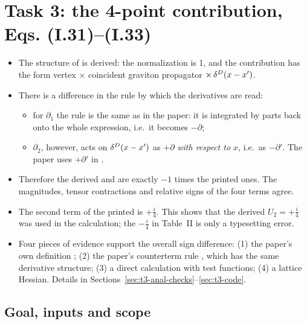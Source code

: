 \section{Task 3: the 4-point contribution, Eqs. (I.31)--(I.33)}
\label{sec:t3}

\begin{discbox}
\begin{itemize}[leftmargin=1.2em,nosep]
\item The structure of  is derived: the normalization is 1, and the
contribution has the form vertex \(\times\) coincident graviton propagator
\(\times\,\delta^D(x-x')\).
\item There is a difference in the rule by which the derivatives are read:
\begin{itemize}[nosep]
\item for \(\partial_1\) the rule is the same as in the paper: it is integrated by parts
back onto the whole expression, i.e.\ it becomes \(-\partial\);
\item \(\partial_2\), however, acts on \(\delta^D(x-x')\) as \(+\partial\) \emph{with respect to
\(x\)}, i.e.\ as \(-\partial'\). The paper uses \(+\partial'\) in .
\end{itemize}
\item Therefore the derived  and  are exactly \(-1\) times the printed
ones. The magnitudes, tensor contractions and relative signs of the four terms agree.
\item The second term of the printed  is \(+\tfrac i4\). This shows that the
derived \(U_2=+\tfrac i4\) was used in the calculation; the \(-\tfrac i4\) in Table~II
is only a typesetting error.
\item Four pieces of evidence support the overall sign difference:
(1) the paper's own definition ;
(2) the paper's counterterm rule , which has the same derivative structure;
(3) a direct calculation with test functions;
(4) a lattice Hessian.
Details in Sections~\ref{sec:t3-anal-checks}--\ref{sec:t3-code}.
\end{itemize}
\end{discbox}

\subsection{Goal, inputs and scope}

